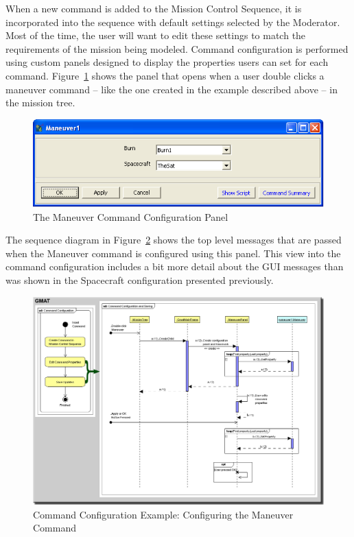 When a new command is added to the Mission Control Sequence, it is incorporated into the sequence
with default settings selected by the Moderator.  Most of the time, the user will want to edit
these settings to match the requirements of the mission being modeled.  Command configuration is
performed using custom panels designed to display the properties users can set for each command.
Figure~\ref{figure:ManeuverConfigPanel} shows the panel that opens when a user double clicks a
maneuver command -- like the one created in the example described above -- in the mission tree.

\begin{figure}[htb]
\begin{center}
\includegraphics[288,88]{Images/ManeuverPanel.png}
\caption{\label{figure:ManeuverConfigPanel}The Maneuver Command Configuration Panel}
\end{center}
\end{figure}

The sequence diagram in Figure~\ref{figure:ManeuverConfiguration} shows the top level messages that
are passed when the Maneuver command is configured using this panel.  This view into the command
configuration includes a bit more detail about the GUI messages than was shown in the Spacecraft
configuration presented previously.

\begin{figure}[htb]
\begin{center}
\includegraphics[455,326]{Images/ManeuverConfiguration.png}
\caption{\label{figure:ManeuverConfiguration}Command Configuration Example: Configuring the Maneuver
Command}
\end{center}
\end{figure}

